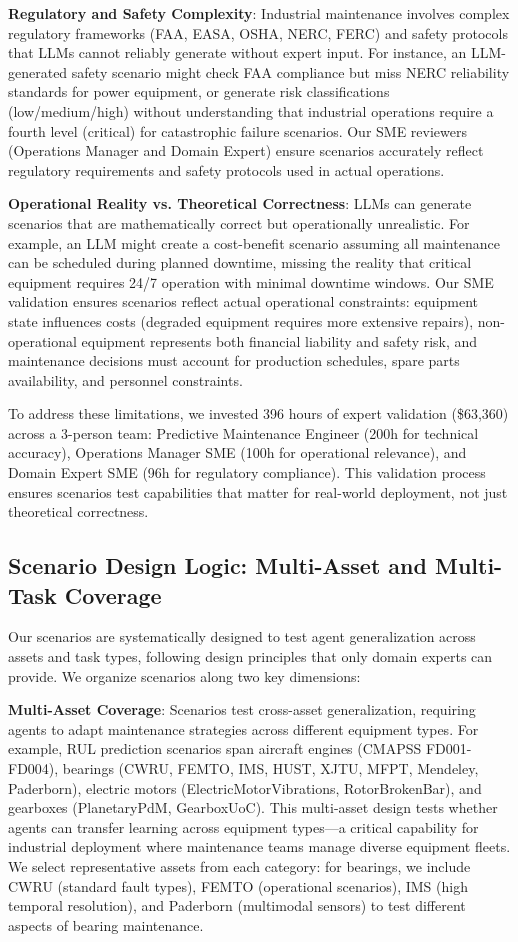 \documentclass[conference]{IEEEtran}
\begin{document}
\textbf{Regulatory and Safety Complexity}: Industrial maintenance involves complex regulatory frameworks (FAA, EASA, OSHA, NERC, FERC) and safety protocols that LLMs cannot reliably generate without expert input. For instance, an LLM-generated safety scenario might check FAA compliance but miss NERC reliability standards for power equipment, or generate risk classifications (low/medium/high) without understanding that industrial operations require a fourth level (critical) for catastrophic failure scenarios. Our SME reviewers (Operations Manager and Domain Expert) ensure scenarios accurately reflect regulatory requirements and safety protocols used in actual operations.

\textbf{Operational Reality vs. Theoretical Correctness}: LLMs can generate scenarios that are mathematically correct but operationally unrealistic. For example, an LLM might create a cost-benefit scenario assuming all maintenance can be scheduled during planned downtime, missing the reality that critical equipment requires 24/7 operation with minimal downtime windows. Our SME validation ensures scenarios reflect actual operational constraints: equipment state influences costs (degraded equipment requires more extensive repairs), non-operational equipment represents both financial liability and safety risk, and maintenance decisions must account for production schedules, spare parts availability, and personnel constraints.

To address these limitations, we invested 396 hours of expert validation (\$63,360) across a 3-person team: Predictive Maintenance Engineer (200h for technical accuracy), Operations Manager SME (100h for operational relevance), and Domain Expert SME (96h for regulatory compliance). This validation process ensures scenarios test capabilities that matter for real-world deployment, not just theoretical correctness.

\subsection{Scenario Design Logic: Multi-Asset and Multi-Task Coverage}

Our scenarios are systematically designed to test agent generalization across assets and task types, following design principles that only domain experts can provide. We organize scenarios along two key dimensions:

\textbf{Multi-Asset Coverage}: Scenarios test cross-asset generalization, requiring agents to adapt maintenance strategies across different equipment types. For example, RUL prediction scenarios span aircraft engines (CMAPSS FD001-FD004), bearings (CWRU, FEMTO, IMS, HUST, XJTU, MFPT, Mendeley, Paderborn), electric motors (ElectricMotorVibrations, RotorBrokenBar), and gearboxes (PlanetaryPdM, GearboxUoC). This multi-asset design tests whether agents can transfer learning across equipment types—a critical capability for industrial deployment where maintenance teams manage diverse equipment fleets. We select representative assets from each category: for bearings, we include CWRU (standard fault types), FEMTO (operational scenarios), IMS (high temporal resolution), and Paderborn (multimodal sensors) to test different aspects of bearing maintenance.
\end{document}

